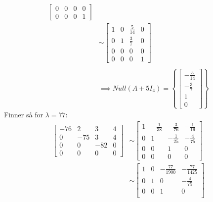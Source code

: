 \documentclass[11pt, a4paper, norsk]{NTNUoving}
\begin{document}
\begin{oppgave}
\begin{punkt}
\begin{align*}
\begin{bmatrix}
                    0 & 0 & 0 & 0 \\
                    0 & 0 & 0 & 1
                \end{bmatrix}
                \\
                &\sim \begin{bmatrix}
                    1 & 0 & \frac{5}{14} & 0 \\
                    0 & 1 & \frac{3}{7} & 0 \\
                    0 & 0 & 0 & 0 \\
                    0 & 0 & 0 & 1
                \end{bmatrix}
                \\
                \\
                &\implies Null(A + 5I_4) = \left\{\begin{bmatrix}
                    -\frac{5}{14} \\
                    -\frac{3}{7} \\
                    1 \\
                    0
                \end{bmatrix}\right\}
            \end{align*}
            Finner så for $\lambda = 77$:
            \begin{align*}
                \begin{bmatrix}
                    -76 & 2 & 3 & 4 \\
                    0 & -75 & 3 & 4 \\
                    0 & 0 & -82 & 0 \\
                    0 & 0 & 0 & 0
                \end{bmatrix} &\sim \begin{bmatrix}
                1 & -\frac{1}{38} & -\frac{3}{76} & -\frac{1}{19} \\
                0 & 1 & -\frac{1}{25} & -\frac{4}{75} \\
                0 & 0 & 1 & 0 \\
                0 & 0 & 0 & 0
                \end{bmatrix}
                \\
                &\sim \begin{bmatrix}
                    1 & 0 & -\frac{77}{1900} & -\frac{77}{1425} \\
                    0 & 1 & 0 & -\frac{4}{75} \\
                    0 & 0 & 1 & 0 \\

\end{bmatrix}
\end{align*}
\end{punkt}
\end{oppgave}
\end{document}
